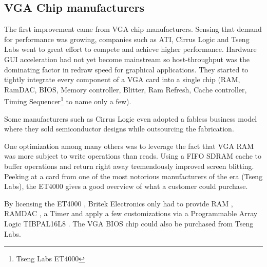 \subsection{VGA Chip manufacturers}
The first improvement came from VGA chip manufacturers. Sensing that demand for performance was growing, companies such as ATI, Cirrus Logic and Tseng Labs went to great effort to compete and achieve higher performance. Hardware GUI acceleration had not yet become mainstream so host-throughput was the dominating factor in redraw speed for graphical applications. They started to tightly integrate every component of a VGA card into a single chip (RAM, RamDAC, BIOS, Memory controller, Blitter, Ram Refresh, Cache controller, Timing Sequencer\footnote{Tseng Labs ET4000} to name only a few).\\
\par
Some manufacturers such as Cirrus Logic even adopted a fabless business model where they sold semiconductor designs while outsourcing the fabrication.


One optimization among many others was to leverage the fact that VGA RAM was more subject to write operations than reads. Using a FIFO SDRAM cache to buffer operations and return right away tremendously improved screen blitting. Peeking at a card from one of the most notorious manufacturers of the era (Tseng Labs), the ET4000 gives a good overview of what a customer could purchase.\\ 
\par
{}
\par
By licensing the ET4000 , Britek Electronics only had to provide RAM , RAMDAC , a Timer  and apply a few customizations via a Programmable Array Logic TIBPAL16L8 . The VGA BIOS chip  could also be purchased from Tseng Labs.\\
\par
\vspace{10pt}

\par



